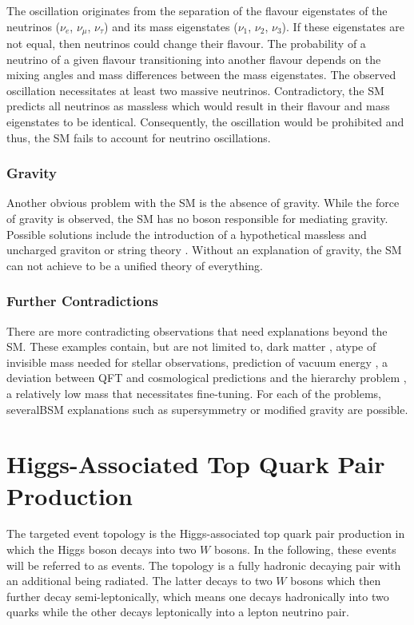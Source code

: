 \documentclass[bachelor,ngerman,english]{GAUBM}
\begin{document}
The oscillation originates from the separation of the flavour eigenstates of the neutrinos ($\nu_e$, $\nu_\mu$, $\nu_\tau$) and its mass eigenstates ($\nu_1$, $\nu_2$, $\nu_3$). If these eigenstates are not equal, then neutrinos could change their flavour. The probability of a neutrino of a given flavour transitioning into another flavour depends on the mixing angles and mass differences between the mass eigenstates. The observed oscillation necessitates at least two massive neutrinos. Contradictory, the SM predicts all neutrinos as massless which would result in their flavour and mass eigenstates to be identical. Consequently, the oscillation would be prohibited and thus, the SM fails to account for neutrino oscillations. 

\subsubsection*{Gravity}
Another obvious problem with the SM is the absence of gravity. While the force of gravity is observed, the SM has no boson responsible for mediating gravity. Possible solutions include the introduction of a hypothetical massless and uncharged graviton \cite{bsm_gravity_01} or string theory \cite{bsm_gravity_02}. Without an explanation of gravity, the SM can not achieve to be a unified theory of everything. 

\subsubsection*{Further Contradictions}
There are more contradicting observations that need explanations beyond the SM. These examples contain, but are not limited to, dark matter \cite{bsm_dark_matter_01,bsm_dark_matter_02,bsm_dark_matter_03}, atype of invisible mass needed for stellar observations, prediction of vacuum energy \cite{bsm_vacuum_energy}, a deviation between QFT and cosmological predictions and the hierarchy problem \cite{bsm_hierarchy}, a relatively low \Hboson mass that necessitates fine-tuning. For each of the problems, severalBSM explanations such as supersymmetry \cite{bsm_supersymmetry} or modified gravity \cite{bsm_mond} are possible.


\section{Higgs-Associated Top Quark Pair Production}
\label{sec:theory:tthww}
The targeted event topology is the Higgs-associated top quark pair production in which the Higgs boson decays into two $W$ bosons. In the following, these events will be referred to as \ttHWW events. The topology is a fully hadronic decaying \ttbar pair with an additional \Hboson being radiated. The latter decays to two $W$ bosons which then further decay semi-leptonically, which means one \wboson decays hadronically into two quarks while the other decays leptonically into a lepton neutrino pair.
\end{document}
